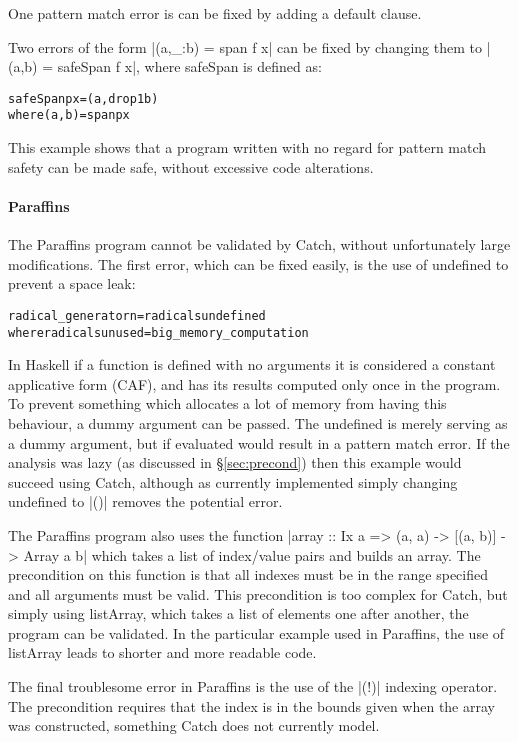 \documentclass[preprint]{sigplanconf}
\newcommand{\C}[1]{\textsf{#1}}
\newenvironment{code}{\begin{alltt}\small}{\end{alltt}}
\begin{document}
One pattern match error is can be fixed by adding a default clause.

Two errors of the form |(a,_:b) = span f x| can be fixed by changing them to |(a,b) = safeSpan f x|, where \C{safeSpan} is defined as:

\begin{code}
safeSpan p x = (a, drop 1 b)
    where (a,b) = span p x
\end{code}

This example shows that a program written with no regard for pattern match safety can be made safe, without excessive code alterations.

\paragraph{Paraffins}

The Paraffins program cannot be validated by Catch, without unfortunately large modifications. The first error, which can be fixed easily, is the use of undefined to prevent a space leak:

\begin{code}
radical_generator n = radicals undefined
  where radicals unused = big_memory_computation
\end{code}

In Haskell if a function is defined with no arguments it is considered a constant applicative form (CAF), and has its results computed only once in the program. To prevent something which allocates a lot of memory from having this behaviour, a dummy argument can be passed. The \C{undefined} is merely serving as a dummy argument, but if evaluated would result in a pattern match error. If the analysis was lazy (as discussed in \S\ref{sec:precond}) then this example would succeed using Catch, although as currently implemented simply changing \C{undefined} to |()| removes the potential error.

The Paraffins program also uses the function |array :: Ix a => (a, a) -> [(a, b)] -> Array a b| which takes a list of index/value pairs and builds an array. The precondition on this function is that all indexes must be in the range specified and all arguments must be valid. This precondition is too complex for Catch, but simply using \C{listArray}, which takes a list of elements one after another, the program can be validated. In the particular example used in Paraffins, the use of \C{listArray} leads to shorter and more readable code.

The final troublesome error in Paraffins is the use of the |(!)| indexing operator. The precondition requires that the index is in the bounds given when the array was constructed, something Catch does not currently model.
\end{document}
